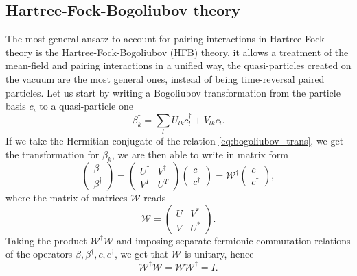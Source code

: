 \subsection{Hartree-Fock-Bogoliubov theory}
\label{sec:hfb}
The most general ansatz to account for pairing interactions in Hartree-Fock theory is the Hartree-Fock-Bogoliubov (HFB) theory, it allows a treatment of the mean-field and pairing interactions in a unified way, the quasi-particles created on the vacuum are the most general ones, instead of being time-reversal paired particles.
Let us start by writing a Bogoliubov transformation from the particle basis $c_i$ to a quasi-particle one 
\begin{equation}
    \label{eq:bogoliubov_trans}
    \beta_k^\dagger = \sum_l U_{lk} c_l^\dagger + V_{lk} c_l.
\end{equation}
If we take the Hermitian conjugate of the relation \eqref{eq:bogoliubov_trans}, we get the transformation for $\beta_k$, we are then able to write in matrix form
\begin{equation}
    \label{eq:bogoliubov_trans_mat}
    \begin{pmatrix}
    \beta\\
    \beta^\dagger
    \end{pmatrix}
    =\begin{pmatrix}
        U^\dagger & V^\dagger \\
        V^T & U^T
    \end{pmatrix}
    \begin{pmatrix}
        c\\
        c^\dagger
    \end{pmatrix}
    =\mathcal W^\dagger \begin{pmatrix}
        c\\
        c^\dagger
    \end{pmatrix},
\end{equation}
where the matrix of matrices $\mathcal W$ reads
\begin{equation}
    \label{eq:bogoliubov_mat}
    \mathcal W = \begin{pmatrix}
        U & V^*\\
        V & U^*
    \end{pmatrix}.
\end{equation}
Taking the product $\mathcal W^\dagger \mathcal W$ and imposing separate fermionic commutation relations of the operators $\beta, \beta^\dagger, c, c^\dagger$, we get that $\mathcal W$ is unitary, hence
\begin{equation}
    \mathcal W^\dagger \mathcal W = \mathcal W \mathcal W^\dagger =  I.
\end{equation}
